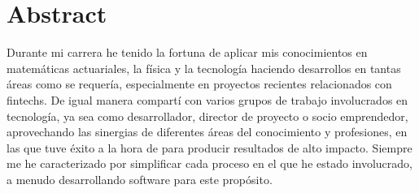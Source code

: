 \section{Abstract}

Durante mi carrera he tenido la fortuna de aplicar mis conocimientos en matemáticas actuariales,
la física y la tecnología haciendo desarrollos en tantas áreas como se requería, especialmente en
proyectos recientes relacionados con fintechs. De igual manera compartí con varios grupos de trabajo
involucrados en tecnología, ya sea como desarrollador, director de proyecto o socio emprendedor,
aprovechando las sinergias de diferentes áreas del conocimiento y profesiones, en las que tuve
éxito a la hora de para producir resultados de alto impacto. Siempre me he caracterizado por
simplificar cada proceso en el que he estado involucrado, a menudo desarrollando software para
este propósito.
